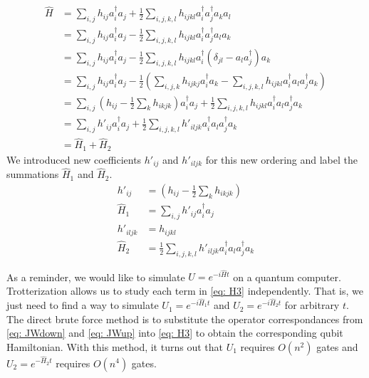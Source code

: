 \begin{equation}
    \begin{split}
        \hat{H} &= \sum_{i, j} h_{ij}a^\dag_ia_j + \frac{1}{2}\sum_{i,j,k,l} h_{ijkl}a^\dag_ia^\dag_ja_ka_l \\
        &= \sum_{i, j} h_{ij}a^\dag_ia_j - \frac{1}{2}\sum_{i,j,k,l} h_{ijkl}a^\dag_ia^\dag_ja_la_k \\
        &= \sum_{i, j} h_{ij}a^\dag_ia_j - \frac{1}{2}\sum_{i,j,k,l} h_{ijkl}a^\dag_i(\delta_{jl} - a_la^\dag_j)a_k \\
        &= \sum_{i, j} h_{ij}a^\dag_ia_j - \frac{1}{2}(\sum_{i, j, k}h_{ijkj}a^\dag_ia_k - \sum_{i,j,k,l} h_{ijkl}a^\dag_ia_la^\dag_ja_k) \\
        &= \sum_{i, j} (h_{ij} - \frac{1}{2}\sum_k h_{ikjk})a^\dag_ia_j + \frac{1}{2}\sum_{i,j,k,l} h_{ijkl}a^\dag_ia_la^\dag_ja_k \\
        &= \sum_{i, j} h'_{ij}a^\dag_ia_j + \frac{1}{2}\sum_{i,j,k,l} h'_{iljk}a^\dag_ia_la^\dag_ja_k \\
        &= \hat{H}_1 + \hat{H}_2
    \end{split}
    \label{eq: H3}
\end{equation}
We introduced new coefficients $h'_{ij}$ and $h'_{iljk}$ for this new ordering and label the summations $\hat{H}_1$ and $\hat{H}_2$.
\begin{equation}
    \begin{split}
        h'_{ij} &= (h_{ij} - \frac{1}{2}\sum_k h_{ikjk}) \\
        \hat{H}_1 &= \sum_{i, j} h'_{ij}a^\dag_ia_j \\
        h'_{iljk} &= h_{ijkl} \\
        \hat{H}_2 &= \frac{1}{2}\sum_{i,j,k,l} h'_{iljk}a^\dag_ia_la^\dag_ja_k
    \end{split}
\end{equation}

As a reminder, we would like to simulate $U = e^{-i\hat{H}t}$ on a quantum computer. Trotterization allows us to study each term in \eqref{eq: H3} independently. That is, we just need to find a way to simulate $U_1 = e^{-i\hat{H}_1t}$ and $U_2 = e^{-i\hat{H}_2t}$ for arbitrary $t$. The direct brute force method is to substitute the operator correspondances from \eqref{eq: JWdown} and \eqref{eq: JWup} into \eqref{eq: H3} to obtain the corresponding qubit Hamiltonian. With this method, it turns out that $U_1$ requires $O(n^2)$ gates and $U_2 = e^{-\hat{H}_2t}$ requires $O(n^4)$ gates.

